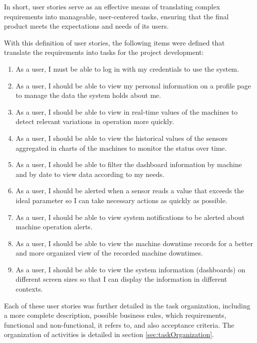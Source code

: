 In short, user stories serve as an effective means of translating complex requirements into manageable, user-centered tasks, ensuring that the final product meets the expectations and needs of its users.

With this definition of user stories, the following items were defined that translate the requirements into tasks for the project development:

\begin{enumerate}
    \item As a user, I must be able to log in with my credentials to use the system.
    \item As a user, I should be able to view my personal information on a profile page to manage the data the system holds about me.
    \item As a user, I should be able to view in real-time values of the machines to detect relevant variations in operation more quickly.
    \item As a user, I should be able to view the historical values of the sensors aggregated in charts of the machines to monitor the status over time.
    \item As a user, I should be able to filter the dashboard information by machine and by date to view data according to my needs.
    \item As a user, I should be alerted when a sensor reads a value that exceeds the ideal parameter so I can take necessary actions as quickly as possible.
    \item As a user, I should be able to view system notifications to be alerted about machine operation alerts.
    \item As a user, I should be able to view the machine downtime records for a better and more organized view of the recorded machine downtimes.
    \item As a user, I should be able to view the system information (dashboards) on different screen sizes so that I can display the information in different contexts.
\end{enumerate}

Each of these user stories was further detailed in the task organization, including a more complete description, possible business rules, which requirements, functional and non-functional, it refers to, and also acceptance criteria. The organization of activities is detailed in section \ref{sec:taskOrganization}.


